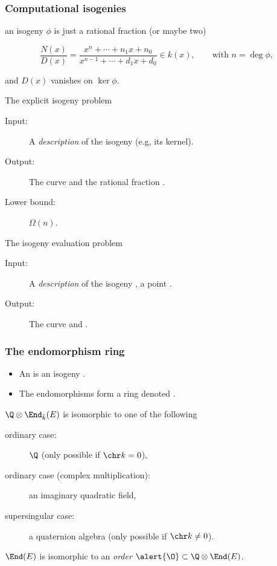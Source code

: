 \documentclass{beamer}
\renewcommand{\emph}[1]{}
\begin{document}
\begin{frame}
  \frametitle{Computational isogenies}
  
  \emph{In practice:} an isogeny $\phi$ is just a rational fraction (or maybe two)
  
  \alert{\[\frac{N(x)}{D(x)} = \frac{x^n + \cdots + n_1x +
      n_0}{x^{n-1} + \cdots + d_1x + d_0} \in k(x),\qquad\text{with }
    n=\deg\phi,\]}
  
  and $D(x)$ vanishes on $\ker\phi$.

  \begin{block}{The explicit isogeny problem}
    \begin{description}
    \item[Input:] A \textit{description} of the isogeny (e.g, its kernel).
    \item[Output:] The curve \emph{$E/H$} and the rational fraction \emph{$N/D$}.
    \item[Lower bound:] $\Omega(n)$.
    \end{description}
  \end{block}

  \begin{block}{The isogeny evaluation problem}
    \begin{description}
    \item[Input:] A \textit{description} of the isogeny \emph{$\phi$},
      a point \emph{$P\in E(k)$}.
    \item[Output:] The curve \emph{$E/H$} and \emph{$\phi(P)$}.
    \end{description}
  \end{block}
\end{frame}


\begin{frame}
  \frametitle{The endomorphism ring}
  
  \begin{itemize}
  \item An \emph{endomorphism} is an isogeny \emph{$\phi:E\to E$}.
  \item The endomorphisms form a ring denoted \emph{$\End_k(E)$}.
  \end{itemize}

  \begin{theorem}
    \alert{$\Q\otimes\End_{\bar{k}}(E)$} is isomorphic to one of the
    following
    \begin{description}
    \item[ordinary case:] \alert{$\Q$} (only possible if $\chr k=0$),
    \item[ordinary case (complex multiplication):] an \alert{imaginary quadratic field},
    \item[supersingular case:] a \alert{quaternion algebra} (only possible if $\chr k\ne0$).
    \end{description}
  \end{theorem}

  \begin{corollary}
    \alert{$\End(E)$} is isomorphic to an \textit{order} 
    $\alert{\O}\subset\Q\otimes\End(E)$.
  \end{corollary}
\end{frame}
\end{document}

